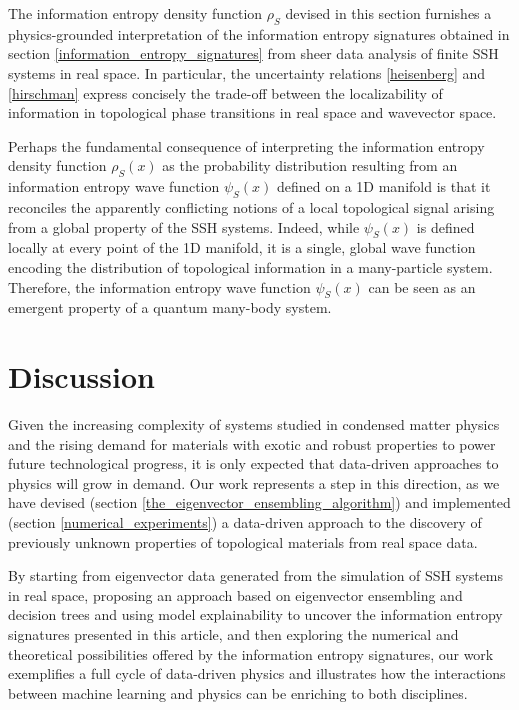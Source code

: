 \documentclass[10pt]{revtex4-1}
\begin{document}
The information entropy density function $\rho_S$ devised in this section furnishes a physics-grounded interpretation of the information entropy signatures obtained in section \ref{information_entropy_signatures} from sheer data analysis of finite SSH systems in real space. In particular, the uncertainty relations \eqref{heisenberg} and \eqref{hirschman} express concisely the trade-off between the localizability of information in topological phase transitions in real space and wavevector space. 

Perhaps the fundamental consequence of interpreting the information entropy density function $\rho_S(x)$ as the probability distribution resulting from an information entropy wave function $\psi_S(x)$ defined on a 1D manifold is that it reconciles the apparently conflicting notions of a local topological signal arising from a global property of the SSH systems. Indeed, while $\psi_S(x)$ is defined locally at every point of the 1D manifold, it is a single, global wave function encoding the distribution of topological information in a many-particle system. Therefore, the information entropy wave function $\psi_S(x)$ can be seen as an emergent property of a quantum many-body system.    

\section{Discussion}
\label{discussion}

Given the increasing complexity of systems studied in condensed matter physics and the rising demand for materials with exotic and robust properties to power future technological progress, it is only expected that data-driven approaches to physics will grow in demand. Our work represents a step in this direction, as we have devised (section \ref{the_eigenvector_ensembling_algorithm}) and implemented (section \ref{numerical_experiments}) a data-driven approach to the discovery of previously unknown properties of topological materials from real space data.

By starting from eigenvector data generated from the simulation of SSH systems in real space, proposing an approach based on eigenvector ensembling and decision trees and using model explainability to uncover the information entropy signatures presented in this article, and then exploring the numerical and theoretical possibilities offered by the information entropy signatures, our work exemplifies a full cycle of data-driven physics and illustrates how the interactions between machine learning and physics can be enriching to both disciplines.      
 
\end{document}
